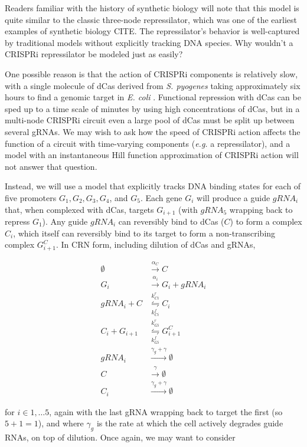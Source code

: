 \documentclass[preprint,12pt]{elsarticle}
\begin{document}
Readers familiar with the history of synthetic biology will note that this model is quite similar to the classic three-node repressilator, which was one of the earliest examples of synthetic biology {CITE}. The repressilator's behavior is well-captured by traditional models without explicitly tracking DNA species. Why wouldn't a CRISPRi repressilator be modeled just as easily? 

One possible reason is that the action of CRISPRi components is relatively slow, with a single molecule of dCas derived from \textit{S. pyogenes} taking approximately six hours to find a genomic target in \textit{E. coli} \cite{Jones2017}. Functional repression with dCas can be sped up to a time scale of minutes by using high concentrations of dCas, but in a multi-node CRISPRi circuit even a large pool of dCas must be split up between several gRNAs. We may wish to ask how the speed of CRISPRi action affects the function of a circuit with time-varying components (\textit{e.g.} a repressilator), and a model with an instantaneous Hill function approximation of CRISPRi action will not answer that question. 

Instead, we will use a model that explicitly tracks DNA binding states for each of five promoters $G_1, G_2, G_3, G_4$, and $G_5$. Each gene $G_i$ will produce a guide $gRNA_i$ that, when complexed with dCas, targets $G_{i+1}$ (with $gRNA_5$ wrapping back to repress $G_1$). Any guide $gRNA_i$ can reversibly bind to dCas ($C$) to form a complex  $C_i$, which itself can reversibly bind to its target to form a non-transcribing complex $G_{i+1}^C$. In CRN form, including dilution of dCas and gRNAs,

\begin{align}
	\emptyset &\xrightarrow{\alpha_C} C\\
	G_i &\xrightarrow{\alpha_i} G_i + gRNA_i\\
	gRNA_i + C &\underset{k_{Ci}^f}{\overset{k_{Ci}^r}{\leftrightharpoons}} C_i\\
	\label{eq:casbindunbind} C_i + G_{i+1} &\underset{k_{Gi}^f}{\overset{k_{Gi}^r}{\leftrightharpoons}} G_{i+1}^C\\
	gRNA_i &\xrightarrow{\gamma_g + \gamma} \emptyset\\
	C &\xrightarrow{\gamma} \emptyset\\
	C_i &\xrightarrow{\gamma_g + \gamma} \emptyset
\end{align}

for $i\in{1,\dots 5}$, again with the last gRNA wrapping back to target the first (so $5+1=1$), and where $\gamma_g$ is the rate at which the cell actively degrades guide RNAs, on top of dilution. Once again, we may want to consider 
\end{document}
